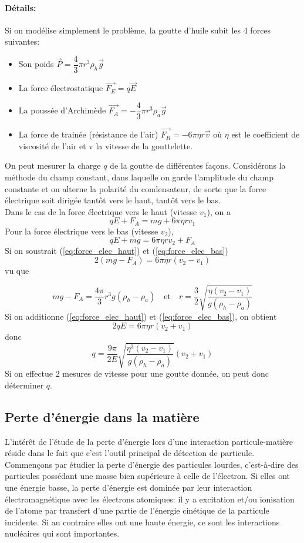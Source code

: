 \paragraph{Détails:} Si on modélise simplement le problème, la goutte d'huile subit les 4 forces suivantes:
\begin{itemize}
    \item Son poids $\Vec{P}=\dfrac{4}{3}\pi r^3 \rho_h\Vec{g}$
    \item La force électrostatique $\Vec{F_E}=q\Vec{E}$
    \item La poussée d'Archimède $\Vec{F_A}=-\dfrac{4}{3}\pi r^3 \rho_a \Vec{g}$
    \item La force de trainée (résistance de l'air) $\Vec{F_R}=-6\pi\eta r\Vec{v}$ où $\eta$ est le coefficient de viscosité de l'air et v la vitesse de la gouttelette.
\end{itemize}
On peut mesurer la charge $q$ de la goutte de différentes façons. Considérons la méthode du champ constant, dans laquelle on garde l'amplitude du champ constante et on alterne la polarité du condensateur, de sorte que la force électrique soit dirigée tantôt vers le haut, tantôt vers le bas. \\[0,2cm]
Dans le cas de la force électrique vers le haut (vitesse $v_1$), on a
\begin{equation}
    qE+F_A = mg+6\pi\eta rv_1
    \label{eq:force_elec_haut}
\end{equation}
    Pour la force électrique vers le bas (vitesse $v_2$),
\begin{equation}
    qE+mg = 6\pi\eta rv_2 + F_A
    \label{eq:force_elec_bas}
\end{equation}
Si on soustrait (\ref{eq:force_elec_haut}) et (\ref{eq:force_elec_bas})
\[
    2(mg-F_A)=6\pi\eta r(v_2-v_1)
\]
vu que

\[
mg-F_A=\dfrac{4\pi}{3}r^3g(\rho_h-\rho_a)\quad\text{et}\quad
r=\dfrac{3}{2}\sqrt{\dfrac{\eta(v_2-v_1)}{g(\rho_h-\rho_a)}}
\]
Si on additionne (\ref{eq:force_elec_haut}) et (\ref{eq:force_elec_bas}), on obtient
\[
    2qE=6\pi\eta r(v_2+v_1)
\]
donc
\[
    q=\dfrac{9\pi}{2E}\sqrt{\dfrac{\eta^3(v_2-v_1)}{g(\rho_h-\rho_a)}}(v_2+v_1)
\]
Si on effectue 2 mesures de vitesse pour une goutte donnée, on peut donc déterminer $q$.

\subsection{Perte d'énergie dans la matière}

L'intérêt de l'étude de la perte d'énergie lors d'une interaction particule-matière réside dans le fait que c'est l'outil principal de détection de particule. Commençons par étudier la perte d'énergie des particules lourdes, c'est-à-dire des particules possédant une masse bien supérieure à celle de l'électron. Si elles ont une énergie basse, la perte d'énergie est dominée par leur interaction électromagnétique avec les électrons atomiques: il y a excitation et/ou ionisation de l'atome par transfert d'une partie de l'énergie cinétique de la particule incidente. Si au contraire elles ont une haute énergie, ce sont les interactions nucléaires qui sont importantes.

